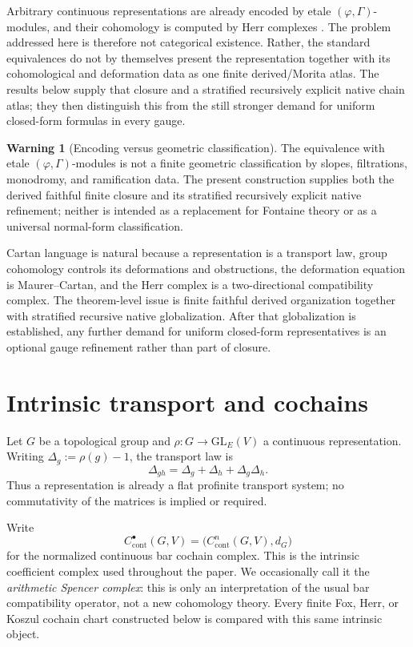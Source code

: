 \documentclass[11pt]{article}
\theoremstyle{definition}
\newtheorem{warning}[theorem]{Warning}
\begin{document}
Arbitrary continuous representations are already encoded by etale $(\varphi,\Gamma)$-modules, and their cohomology is computed by Herr complexes \cite{FontaineLocal,CherbonnierColmez,HerrSurvey,LiuCohomology,KPXFamilies}.  The problem addressed here is therefore not categorical existence.  Rather, the standard equivalences do not by themselves present the representation together with its cohomological and deformation data as one finite derived/Morita atlas.  The results below supply that closure and a stratified recursively explicit native chain atlas; they then distinguish this from the still stronger demand for uniform closed-form formulas in every gauge.

\begin{warning}[Encoding versus geometric classification]
The equivalence with etale $(\varphi,\Gamma)$-modules is not a finite geometric classification by slopes, filtrations, monodromy, and ramification data.  The present construction supplies both the derived faithful finite closure and its stratified recursively explicit native refinement; neither is intended as a replacement for Fontaine theory or as a universal normal-form classification.
\end{warning}

Cartan language is natural because a representation is a transport law, group cohomology controls its deformations and obstructions, the deformation equation is Maurer--Cartan, and the Herr complex is a two-directional compatibility complex.  The theorem-level issue is finite faithful derived organization together with stratified recursive native globalization.  After that globalization is established, any further demand for uniform closed-form representatives is an optional gauge refinement rather than part of closure.

\section{Intrinsic transport and cochains}

Let $G$ be a topological group and
$\rho:G\to\mathrm{GL}_E(V)$ a continuous representation.  Writing
$\Delta_g:=\rho(g)-1$, the transport law is
\[
 \Delta_{gh}=\Delta_g+\Delta_h+\Delta_g\Delta_h.
\]
Thus a representation is already a flat profinite transport system; no
commutativity of the matrices is implied or required.

Write
\[
 C^\bullet_{\mathrm{cont}}(G,V)
 =\bigl(C^n_{\mathrm{cont}}(G,V),d_G\bigr)
\]
for the normalized continuous bar cochain complex.  This is the intrinsic
coefficient complex used throughout the paper.  We occasionally call it the
\emph{arithmetic Spencer complex}: this is only an interpretation of the usual
bar compatibility operator, not a new cohomology theory.  Every finite Fox,
Herr, or Koszul cochain chart constructed below is compared with this same
intrinsic object.
\end{document}
